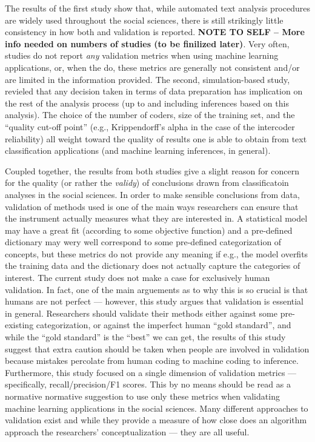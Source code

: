 \documentclass[man, 12pt, a4paper, nolmodern, noextraspace]{apa6}
\begin{document}
The results of the first study show that, while automated text analysis procedures are widely used throughout the social sciences, there is still strikingly little consistency in how both  and  validation is reported. \textbf{NOTE TO SELF -- More info needed on numbers of studies (to be finilized later)}. Very often, studies do not report \textit{any} validation metrics when using machine learning applications, or, when the do, these metrics are generally not consistent and/or are limited in the information provided. The second, simulation-based study, revieled that any decision taken in terms of data preparation has implication on the rest of the analysis process (up to and including inferences based on this analysis). The choice of the number of coders, size of the training set, and the ``quality cut-off point'' (e.g., Krippendorff's alpha in the case of the intercoder reliability) all weight toward the quality of results one is able to obtain from text classification applications (and machine learning inferences, in general).


Coupled together, the results from both studies give a slight reason for concern for the quality (or rather the \textit{validy}) of conclusions drawn from classificatoin analyses in the social sciences. In order to make sensible conclusions from data, validation of methods used is one of the main ways researchers can ensure that the instrument actually measures what they are interested in. A statistical model may have a great fit (according to some objective function) and a pre-defined dictionary may wery well correspond to some pre-defined categorization of concepts, but these metrics do not provide any meaning if e.g., the model overfits the training data and the dictionary does not actually capture the categories of interest. The current study does not make a case for exclusively human validation. In fact, one of the main arguements as to why this is so crucial is that humans are not perfect --- however, this study argues that validation is essential in general. Researchers should validate their methods either against some pre-existing categorization, or against the imperfect human ``gold standard'', and while the ``gold standard'' is the ``best'' we can get, the results of this study suggest that extra caution should be taken when people are involved in validation because mistakes percolate from human coding to machine coding to inference. Furthermore, this study focused on a single dimension of validation metrics --- specifically, recall/precision/F1 scores. This by no means should be read as a normative normative suggestion to use only these metrics when validating machine learning applications in the social sciences. Many different approaches to validation exist and while they provide a measure of how close does an algorithm approach the researchers' conceptualization --- they are all useful.
\end{document}
